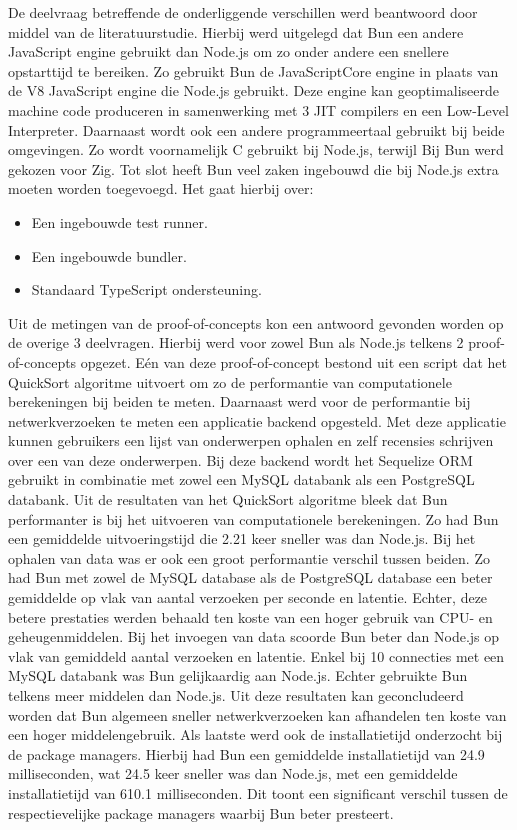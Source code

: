 De deelvraag betreffende de onderliggende verschillen werd beantwoord door middel van de literatuurstudie.
Hierbij werd uitgelegd dat Bun een andere JavaScript engine gebruikt dan Node.js om zo onder andere een snellere opstarttijd te bereiken.
Zo gebruikt Bun de JavaScriptCore engine in plaats van de V8 JavaScript engine die Node.js gebruikt.
Deze engine kan geoptimaliseerde machine code produceren in samenwerking met 3 JIT compilers en een Low-Level Interpreter.
Daarnaast wordt ook een andere programmeertaal gebruikt bij beide omgevingen. Zo wordt voornamelijk C gebruikt bij Node.js, terwijl Bij Bun werd gekozen voor Zig.
Tot slot heeft Bun veel zaken ingebouwd die bij Node.js extra moeten worden toegevoegd.
Het gaat hierbij over:
\begin{itemize}
    \item Een ingebouwde test runner.
    \item Een ingebouwde bundler.
    \item Standaard TypeScript ondersteuning.
\end{itemize}
Uit de metingen van de proof-of-concepts kon een antwoord gevonden worden op de overige 3 deelvragen.
Hierbij werd voor zowel Bun als Node.js telkens 2 proof-of-concepts opgezet. 
Eén van deze proof-of-concept bestond uit een script dat het QuickSort algoritme uitvoert om zo de performantie van computationele berekeningen bij beiden te meten.
Daarnaast werd voor de performantie bij netwerkverzoeken te meten een applicatie backend opgesteld. Met deze applicatie kunnen gebruikers
een lijst van onderwerpen ophalen en zelf recensies schrijven over een van deze onderwerpen.
Bij deze backend wordt het Sequelize ORM gebruikt in combinatie met zowel een MySQL databank als een PostgreSQL databank.
Uit de resultaten van het QuickSort algoritme bleek dat Bun performanter is bij het uitvoeren van computationele berekeningen.
Zo had Bun een gemiddelde uitvoeringstijd die 2.21 keer sneller was dan Node.js.
Bij het ophalen van data was er ook een groot performantie verschil tussen beiden. Zo had Bun met zowel de MySQL database als de PostgreSQL database 
een beter gemiddelde op vlak van aantal verzoeken per seconde en latentie. Echter, deze betere prestaties werden behaald ten koste van een hoger gebruik van CPU- en geheugenmiddelen.
Bij het invoegen van data scoorde Bun beter dan Node.js op vlak van gemiddeld aantal verzoeken en latentie.
Enkel bij 10 connecties met een MySQL databank was Bun gelijkaardig aan Node.js.
Echter gebruikte Bun telkens meer middelen dan Node.js.
Uit deze resultaten kan geconcludeerd worden dat Bun algemeen sneller netwerkverzoeken kan afhandelen
ten koste van een hoger middelengebruik.
Als laatste werd ook de installatietijd onderzocht bij de package managers. Hierbij had Bun een 
gemiddelde installatietijd van 24.9 milliseconden, wat 24.5 keer sneller was dan Node.js, met een gemiddelde installatietijd van 610.1 milliseconden.
Dit toont een significant verschil tussen de respectievelijke package managers waarbij Bun beter presteert.

